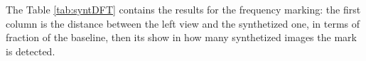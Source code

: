 The Table \ref{tab:syntDFT} contains the results for the frequency marking: the first column is the distance between the left view and the synthetized one, in terms of fraction of the baseline, then its show in how many synthetized images the mark is detected.


 
 \begin{table}[h!]
 \begin{center}
\caption{Detection in the syntetized views. \label{tab:syntDFT}}
\end{center}
\end{table}

 
  
